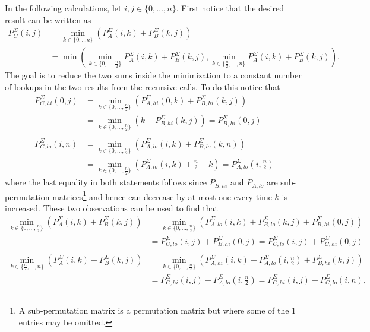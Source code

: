 \documentclass[twoside,11pt,openright]{report}
\begin{document}
In the following calculations, let $i, j \in \{0, \dots, n\}$. First notice that the desired result can be written as
\begin{align*}
  P_C^{\Sigma}(i, j) &= \min_{k \in \{0, \dots n\}} \left( P_A^{\Sigma}(i, k) + P_B^{\Sigma}(k, j) \right) \\
    &= \min\left( \min_{k \in \{0, \dots, \frac{n}{2}\}} {P_A^{\Sigma}(i, k) + P_B^{\Sigma}(k, j)}, \min_{k \in \{\frac{n}{2}, \dots, n\}} {P_A^{\Sigma}(i, k) + P_B^{\Sigma}(k, j)} \right).
\end{align*}
The goal is to reduce the two sums inside the minimization to a constant number of lookups in the two results from the recursive calls. To do this notice that
\begin{align*}
  P_{C,hi}^{\Sigma}(0, j) &= \min_{k \in \{0, \dots, \frac{n}{2}\}} \left( P_{A,hi}^{\Sigma}(0, k) + P_{B,hi}^{\Sigma}(k, j) \right) \\
    &= \min_{k \in \{0, \dots, \frac{n}{2}\}} \left( k + P_{B,hi}^{\Sigma}(k, j) \right) = P_{B,hi}^{\Sigma}(0, j)
  \\ \\
  P_{C,lo}^{\Sigma}(i, n) &= \min_{k \in \{0, \dots, \frac{n}{2}\}} \left( P_{A,lo}^{\Sigma}(i, k) + P_{B,lo}^{\Sigma}(k, n) \right) \\
    &= \min_{k \in \{0, \dots, \frac{n}{2}\}} \left( P_{A,lo}^{\Sigma}(i, k) + \frac{n}{2} - k \right)
    = P_{A,lo}^{\Sigma}(i, \frac{n}{2})
\end{align*}
where the last equality in both statements follows since $P_{B,hi}$ and $P_{A,lo}$ are sub-permutation matrices\footnote{A sub-permutation matrix is a permutation matrix but where some of the $1$ entries may be omitted.} and hence can decrease by at most one every time $k$ is increased. These two observations can be used to find that
\begin{align*}
  \min_{k \in \{0, \dots, \frac{n}{2}\}} \left( P_A^{\Sigma}(i, k) + P_B^{\Sigma}(k, j) \right)
    &= \min_{k \in \{0, \dots, \frac{n}{2}\}} \left( P_{A,lo}^{\Sigma}(i, k) + P_{B,lo}^{\Sigma}(k, j) + P_{B,hi}^{\Sigma}(0, j) \right) \\
    &= P_{C,lo}^{\Sigma}(i, j) + P_{B,hi}^{\Sigma}(0, j)
    = P_{C,lo}^{\Sigma}(i, j) + P_{C,hi}^{\Sigma}(0, j)
  \\ \\
  \min_{k \in \{\frac{n}{2}, \dots, n\}} \left( P_A^{\Sigma}(i, k) + P_B^{\Sigma}(k, j) \right)
    &= \min_{k \in \{0, \dots, \frac{n}{2}\}} \left( P_{A,hi}^{\Sigma}(i, k) + P_{A,lo}^{\Sigma}(i, \frac{n}{2}) + P_{B,hi}^{\Sigma}(k, j) \right) \\
    &= P_{C,hi}^{\Sigma}(i, j) + P_{A,lo}^{\Sigma}(i, \frac{n}{2})
    = P_{C,hi}^{\Sigma}(i, j) + P_{C,lo}^{\Sigma}(i, n),
\end{align*}
\end{document}
